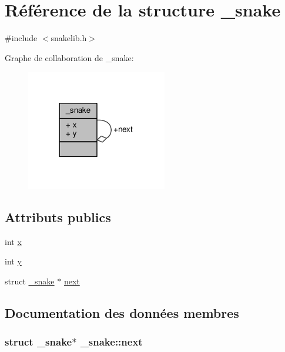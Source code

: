 \hypertarget{struct__snake}{}\section{Référence de la structure \+\_\+snake}
\label{struct__snake}


{\ttfamily \#include $<$snakelib.\+h$>$}



Graphe de collaboration de \+\_\+snake\+:\nopagebreak
\begin{figure}[H]
\begin{center}
\leavevmode
\includegraphics[width=174pt]{struct__snake__coll__graph}
\end{center}
\end{figure}
\subsection*{Attributs publics}
\begin{DoxyCompactItemize}
\item 
int \hyperlink{struct__snake_a58c7bdb2d495a8590718f12d2f7b4c20}{x}
\item 
int \hyperlink{struct__snake_a8739255d28f8c276b848dedda629a5d3}{y}
\item 
struct \hyperlink{struct__snake}{\+\_\+snake} $\ast$ \hyperlink{struct__snake_aa43aac7fd83d61bd422d927ffa889a69}{next}
\end{DoxyCompactItemize}


\subsection{Documentation des données membres}
\subsubsection[{\texorpdfstring{next}{next}}]{\setlength{\rightskip}{0pt plus 5cm}struct {\bf \+\_\+snake}$\ast$ \+\_\+snake\+::next}\hypertarget{struct__snake_aa43aac7fd83d61bd422d927ffa889a69}{}\label{struct__snake_aa43aac7fd83d61bd422d927ffa889a69}
